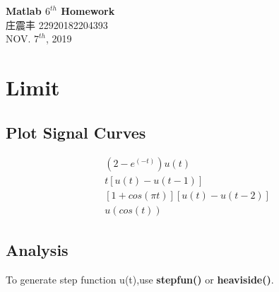\documentclass[UTF8,a4paper]{article}
\begin{document}
\begin{center}
    \textbf{\LARGE{Matlab $6^{th}$ Homework}}\\[0.5cm]
    \normalsize{庄震丰 22920182204393}\\[0.5cm]
    \large{NOV. $7^{th}$, 2019}
\end{center}
\section{Limit}
\subsection{Plot Signal Curves}
 
$$
\begin{aligned}
    &(2-e^(-t))u(t)\\
    &t[u(t)-u(t-1)]\\
    &[1+cos(\pi t)][u(t)-u(t-2)]\\
    &u(cos(t))
\end{aligned}
$$
\subsection{Analysis}
\noindent To generate step function u(t),use \textbf{stepfun()} or \textbf{heaviside()}.
\end{document}
